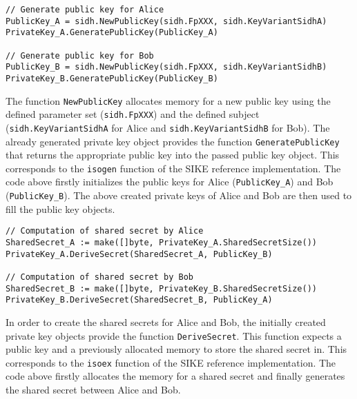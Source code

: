 \begin{lstlisting}[]
// Generate public key for Alice
PublicKey_A = sidh.NewPublicKey(sidh.FpXXX, sidh.KeyVariantSidhA)
PrivateKey_A.GeneratePublicKey(PublicKey_A)

// Generate public key for Bob
PublicKey_B = sidh.NewPublicKey(sidh.FpXXX, sidh.KeyVariantSidhB)
PrivateKey_B.GeneratePublicKey(PublicKey_B)
\end{lstlisting}
The function \texttt{NewPublicKey} allocates memory for a new public key using the defined parameter set (\texttt{sidh.FpXXX}) and the defined subject (\texttt{sidh.KeyVariantSidhA} for Alice and \texttt{sidh.KeyVariantSidhB} for Bob). The already generated private key object provides the function \texttt{GeneratePublicKey} that returns the appropriate public key into the passed public key object. This corresponds to the \texttt{isogen} function of the SIKE reference implementation.
The code above firstly initializes the public keys for Alice (\textcolor{keywordcol}{\texttt{PublicKey\_A}}) and Bob (\textcolor{keywordcol}{\texttt{PublicKey\_B}}). The above created private keys of Alice and Bob are then used to fill the public key objects.\\


\begin{lstlisting}[]
// Computation of shared secret by Alice
SharedSecret_A := make([]byte, PrivateKey_A.SharedSecretSize())
PrivateKey_A.DeriveSecret(SharedSecret_A, PublicKey_B)

// Computation of shared secret by Bob
SharedSecret_B := make([]byte, PrivateKey_B.SharedSecretSize())
PrivateKey_B.DeriveSecret(SharedSecret_B, PublicKey_A)
\end{lstlisting}
In order to create the shared secrets for Alice and Bob, the initially created private key objects provide the function \texttt{DeriveSecret}. This function expects a public key and a previously allocated memory to store the shared secret in. This corresponds to the \texttt{isoex} function of the SIKE reference implementation.
The code above firstly allocates the memory for a shared secret and finally generates the shared secret between Alice and Bob.

